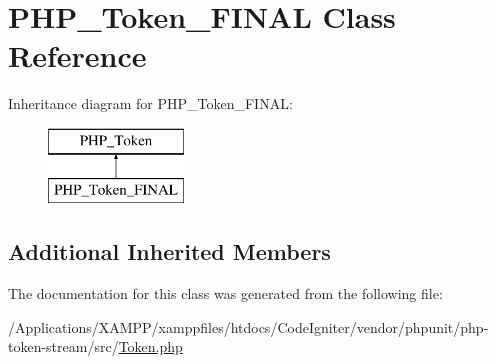 \hypertarget{class_p_h_p___token___f_i_n_a_l}{}\section{P\+H\+P\+\_\+\+Token\+\_\+\+F\+I\+N\+AL Class Reference}
\label{class_p_h_p___token___f_i_n_a_l}
Inheritance diagram for P\+H\+P\+\_\+\+Token\+\_\+\+F\+I\+N\+AL\+:\begin{figure}[H]
\begin{center}
\leavevmode
\includegraphics[height=2.000000cm]{class_p_h_p___token___f_i_n_a_l}
\end{center}
\end{figure}
\subsection*{Additional Inherited Members}


The documentation for this class was generated from the following file\+:\begin{DoxyCompactItemize}
\item 
/\+Applications/\+X\+A\+M\+P\+P/xamppfiles/htdocs/\+Code\+Igniter/vendor/phpunit/php-\/token-\/stream/src/\mbox{\hyperlink{_token_8php}{Token.\+php}}\end{DoxyCompactItemize}

